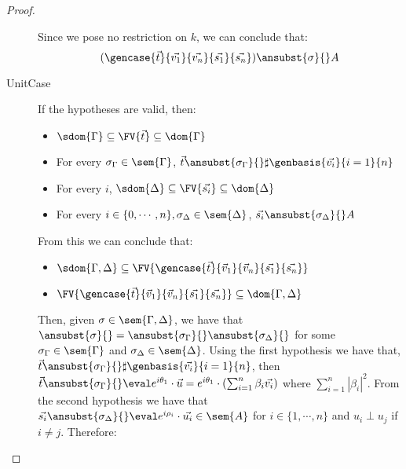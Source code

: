 \begin{proof}
\begin{description}
    Since we pose no restriction on $k$, we can conclude that:
    \[(\gencase{\vec{t}}{\vec{v_1}}{\vec{v_n}}{\vec{s_1}}{\vec{s_n}})\ansubst{\sigma}{}\real A\]


    \item[UnitCase] If the hypotheses are valid, then:
    \begin{itemize}
        \item $\sdom{\Gamma}\subseteq \FV{\vec{t}}\subseteq \dom{\Gamma}$
        \item For every $\sigma_\Gamma\in\sem{\Gamma}$, $\vec{t}\ansubst{\sigma_\Gamma}{}\real\sharp\genbasis{\vec{v_i}}{i=1}{n}$
        \item For every $i$, $\sdom{\Delta}\subseteq \FV{\vec{s_i}}\subseteq \dom{\Delta}$
        \item For every $i\in\{0,\dotsb ,n\}, \sigma_\Delta\in\sem{\Delta}$, $\vec{s_i}\ansubst{\sigma_\Delta}{}\real A$
    \end{itemize}
    
    From this we can conclude that:
    
    \begin{itemize}
        \item $\sdom{\Gamma,\Delta}\subseteq \FV{\gencase{\vec{t}}{\vec v_1}{\vec v_n}{\vec{s_1}}{\vec{s_n}}}$
        \item $\FV{\gencase{\vec{t}}{\vec v_1}{\vec v_n}{\vec{s_1}}{\vec{s_n}}}\subseteq \dom{\Gamma,\Delta}$
    \end{itemize}
    
    Then, given $\sigma\in\sem{\Gamma,\Delta}$, we have that $\ansubst{\sigma}{}=\ansubst{\sigma_\Gamma}{}\ansubst{\sigma_\Delta}{}$ for some $\sigma_\Gamma\in\sem{\Gamma}$ and $\sigma_\Delta\in\sem{\Delta}$. Using the first hypothesis we have that, $\vec{t}\ansubst{\sigma_\Gamma}{}\real\sharp\genbasis{\vec{v_i}}{i=1}{n}$, then $\vec{t}\ansubst{\sigma_\Gamma}{}\eval e^{i\theta_1}\cdot\vec{u}=e^{i\theta_1}\cdot(\sum_{i=1}^{n}\beta_i \vec{v_i})$ where $\sum_{i=1}^{n}|\beta_i|^2$. From the second hypothesis we have that $\vec{s_i}\ansubst{\sigma_\Delta}{}\eval e^{i\rho_i}\cdot\vec{u_i}\in\sem{A}$ for $i\in\{1,\dotsb ,n\}$ and $u_i\perp u_j$ if $i\neq j$. Therefore:


\end{description}
\end{proof}
